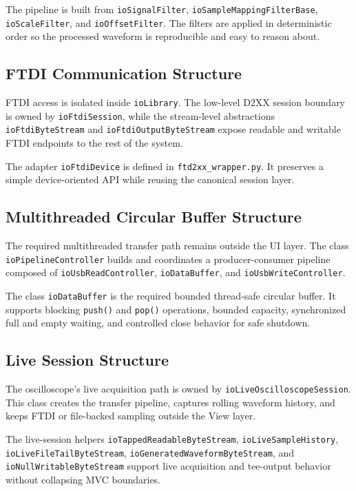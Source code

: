     The pipeline is built from \texttt{ioSignalFilter}, \texttt{ioSampleMappingFilterBase}, \texttt{ioScaleFilter}, and \texttt{ioOffsetFilter}. The filters are applied in deterministic order so the processed waveform is reproducible and easy to reason about.

    \subsection{FTDI Communication Structure}
    FTDI access is isolated inside \texttt{ioLibrary}. The low-level D2XX session boundary is owned by \texttt{ioFtdiSession}, while the stream-level abstractions \texttt{ioFtdiByteStream} and \texttt{ioFtdiOutputByteStream} expose readable and writable FTDI endpoints to the rest of the system.

    The adapter \texttt{ioFtdiDevice} is defined in \texttt{ftd2xx\_wrapper.py}. It preserves a simple device-oriented API while reusing the canonical session layer.

    \subsection{Multithreaded Circular Buffer Structure}
    The required multithreaded transfer path remains outside the UI layer. The class \texttt{ioPipelineController} builds and coordinates a producer-consumer pipeline composed of \texttt{ioUsbReadController}, \texttt{ioDataBuffer}, and \texttt{ioUsbWriteController}.

    The class \texttt{ioDataBuffer} is the required bounded thread-safe circular buffer. It supports blocking \texttt{push()} and \texttt{pop()} operations, bounded capacity, synchronized full and empty waiting, and controlled close behavior for safe shutdown.

    \subsection{Live Session Structure}
    The oscilloscope's live acquisition path is owned by \texttt{ioLiveOscilloscopeSession}. This class creates the transfer pipeline, captures rolling waveform history, and keeps FTDI or file-backed sampling outside the View layer.

    The live-session helpers \texttt{ioTappedReadableByteStream}, \texttt{ioLiveSampleHistory}, \texttt{ioLiveFileTailByteStream}, \texttt{ioGeneratedWaveformByteStream}, and \texttt{ioNullWritableByteStream} support live acquisition and tee-output behavior without collapsing MVC boundaries.

